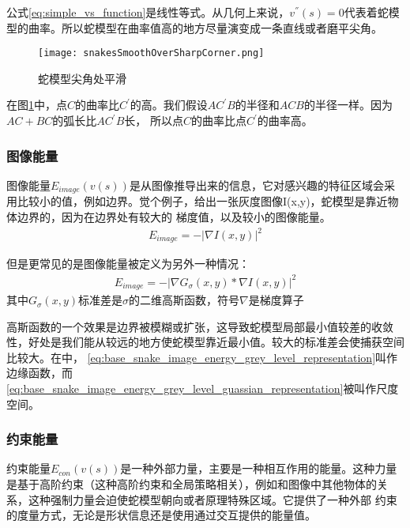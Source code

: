公式\eqref{eq:simple_vs_function}是线性等式。从几何上来说，$v^{''}(s)=0$代表着蛇模型的曲率。所以蛇模型在曲率值高的地方尽量演变成一条直线或者磨平尖角。

\begin{figure}[htbp]
	\centering
	\texttt{[image: snakesSmoothOverSharpCorner.png]}
	\caption{蛇模型尖角处平滑}\label{fig:snakesSmoothOverSharpCorner}
\end{figure}

在图\ref{fig:snakesSmoothOverSharpCorner}中，点$C$的曲率比$C^{'}$的高。我们假设$AC^{'}B$的半径和$ACB$的半径一样。因为$AC+BC$的弧长比$AC^{'}B$长，
所以点$C$的曲率比点$C^{'}$的曲率高。

\subsubsection{图像能量}
图像能量$E_{image}(v(s))$是从图像推导出来的信息，它对感兴趣的特征区域会采用比较小的值，例如边界。觉个例子，给出一张灰度图像I(x,y)，蛇模型是靠近物体边界的，因为在边界处有较大的
梯度值，以及较小的图像能量。
\begin{align}\label{eq:base_snake_image_energy_grey_level_representation}
	E_{image} = -|\nabla I(x,y)|^{2}
\end{align}

但是更常见的是图像能量被定义为另外一种情况：
\begin{align}\label{eq:base_snake_image_energy_grey_level_guassian_representation}
E_{image} = -|\nabla G_{\sigma}(x,y) *  \nabla I(x,y)|^{2}
\end{align}
其中$G_{\sigma}(x,y)$标准差是$\sigma$的二维高斯函数，符号$\nabla$是梯度算子

高斯函数的一个效果是边界被模糊或扩张，这导致蛇模型局部最小值较差的收敛性，好处是我们能从较远的地方使蛇模型靠近最小值。较大的标准差会使捕获空间比较大。在\cite{kass1988snakes}中，
\eqref{eq:base_snake_image_energy_grey_level_representation}叫作边缘函数，而\eqref{eq:base_snake_image_energy_grey_level_guassian_representation}被叫作尺度空间。

\subsubsection{约束能量}
约束能量$E_{con}(v(s))$是一种外部力量，主要是一种相互作用的能量。这种力量是基于高阶约束（这种高阶约束和全局策略相关），例如和图像中其他物体的关系，这种强制力量会迫使蛇模型朝向或者原理特殊区域。它提供了一种外部
约束的度量方式，无论是形状信息还是使用通过交互提供的能量值。


